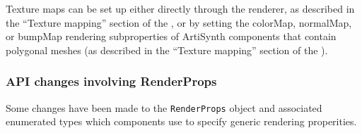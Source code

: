 \documentclass{article}
\begin{document}
Texture maps can be set up either directly through the renderer, as
described in the ``Texture mapping'' section of the
, 
or by setting the {\sf colorMap}, {\sf
normalMap}, or {\sf bumpMap} rendering subproperties of ArtiSynth
components that contain polygonal meshes (as described in the
``Texture mapping'' section of the
).

\subsubsection*{API changes involving RenderProps}

Some changes have been made to the {\tt RenderProps} object and
associated enumerated types which components use to specify generic
rendering properities.
\end{document}

